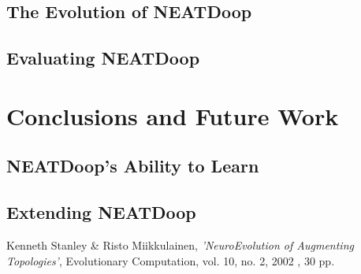\documentclass[]{Learning-to-Play-Wolfenstein-thesis}
\begin{document}
\section{The Evolution of NEATDoop}


\section{Evaluating NEATDoop}		%

\chapter{Conclusions and Future Work}%
\section{NEATDoop's Ability to Learn}
\section{Extending NEATDoop}

\newpage
\begin{thebibliography}{99}
 Kenneth Stanley \& Risto Miikkulainen, \emph{'NeuroEvolution of Augmenting Topologies'}, Evolutionary Computation, vol. 10, no. 2, 2002 , 30 pp.
\end{thebibliography}
\label{endpage}
\end{document}
